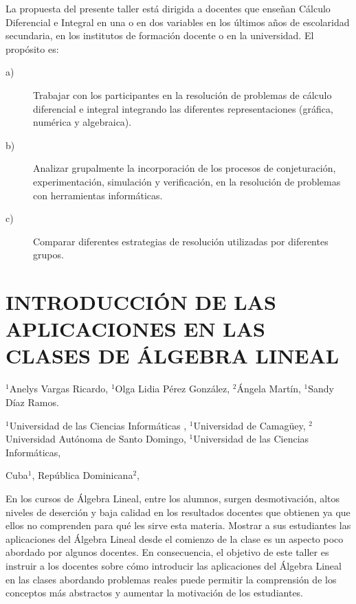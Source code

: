 La propuesta del presente taller está dirigida a docentes que enseñan
Cálculo Diferencial e Integral en una o en dos variables en los últimos
años de escolaridad secundaria, en los institutos de formación docente
o en la universidad. El propósito es: 
\begin{description}
\item [{a)}] Trabajar con los participantes en la resolución de problemas
de cálculo diferencial e integral integrando las diferentes representaciones
(gráfica, numérica y algebraica). 
\item [{b)}] Analizar grupalmente la incorporación de los procesos de conjeturación,
experimentación, simulación y verificación, en la resolución de problemas
con herramientas informáticas. 
\item [{c)}] Comparar diferentes estrategias de resolución utilizadas por
diferentes grupos.
\end{description}

\section{INTRODUCCIÓN DE LAS APLICACIONES EN LAS CLASES DE ÁLGEBRA LINEAL}

\begin{datos}

$^{1}$Anelys Vargas Ricardo, $^{1}$Olga Lidia Pérez González, $^{2}$Ángela
Martín, $^{1}$Sandy Díaz Ramos.

$^{1}$Universidad de las Ciencias Informáticas , $^{1}$Universidad
de Camagüey, $^{2}$Universidad Autónoma de Santo Domingo, $^{1}$Universidad
de las Ciencias Informáticas,

Cuba$^{1}$, República Dominicana$^{2}$, 

\end{datos}

En los cursos de Álgebra Lineal, entre los alumnos, surgen desmotivación,
altos niveles de deserción y baja calidad en los resultados docentes
que obtienen ya que ellos no comprenden para qué les sirve esta materia.
Mostrar a sus estudiantes las aplicaciones del Álgebra Lineal desde
el comienzo de la clase es un aspecto poco abordado por algunos docentes.
En consecuencia, el objetivo de este taller es instruir a los docentes
sobre cómo introducir las aplicaciones del Álgebra Lineal en las clases
abordando problemas reales puede permitir la comprensión de los conceptos
más abstractos y aumentar la motivación de los estudiantes.

\setcounter{section}{19}


